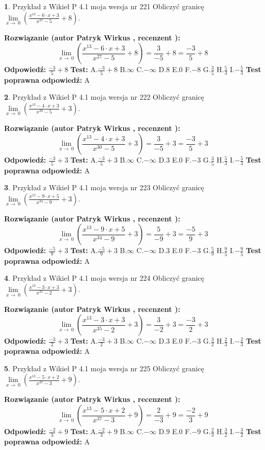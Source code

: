 \documentclass[12pt, a4paper]{article}
\theoremstyle{definition} %
\newtheorem{zad}{}
\newcommand{\zadStart}[1]{\begin{zad}#1\newline}
\newcommand{\zadStop}{\end{zad}}
\newcommand{\rozwStart}[2]{\noindent \textbf{Rozwiązanie (autor #1 , recenzent #2): }\newline}
\newcommand{\rozwStop}{\newline}
\newcommand{\odpStart}{\noindent \textbf{Odpowiedź:}\newline}
\newcommand{\odpStop}{\newline}
\newcommand{\testStart}{\noindent \textbf{Test:}\newline}
\newcommand{\testStop}{\newline}
\newcommand{\kluczStart}{\noindent \textbf{Test poprawna odpowiedź:}\newline}
\newcommand{\kluczStop}{\newline}
\begin{document}
\zadStart{Przykład z Wikieł P 4.1 moja wersja nr 221}
Obliczyć granicę $\lim\limits_{x\to\ 0}(\frac{x^{13}-6 \cdot x +3}{x^{27}-5}+8)$.
\zadStop
\rozwStart{Patryk Wirkus}{}
$$\lim\limits_{x\to\ 0}(\frac{x^{13}-6 \cdot x +3}{x^{27}-5}+8)=\frac{3}{-5}+8=\frac{-3}{5}+8$$
\rozwStop
\odpStart
$\frac{-3}{5}+8$
\odpStop
\testStart
A.$\frac{-3}{5}+8$
B.$\infty$
C.$-\infty$
D.$8$
E.$0$
F.$-8$
G.$\frac{3}{5}$
H.$\frac{5}{3}$
I.$-\frac{5}{3}$
\testStop
\kluczStart
A
\kluczStop



\zadStart{Przykład z Wikieł P 4.1 moja wersja nr 222}
Obliczyć granicę $\lim\limits_{x\to\ 0}(\frac{x^{13}-4 \cdot x +3}{x^{30}-5}+3)$.
\zadStop
\rozwStart{Patryk Wirkus}{}
$$\lim\limits_{x\to\ 0}(\frac{x^{13}-4 \cdot x +3}{x^{30}-5}+3)=\frac{3}{-5}+3=\frac{-3}{5}+3$$
\rozwStop
\odpStart
$\frac{-3}{5}+3$
\odpStop
\testStart
A.$\frac{-3}{5}+3$
B.$\infty$
C.$-\infty$
D.$3$
E.$0$
F.$-3$
G.$\frac{3}{5}$
H.$\frac{5}{3}$
I.$-\frac{5}{3}$
\testStop
\kluczStart
A
\kluczStop



\zadStart{Przykład z Wikieł P 4.1 moja wersja nr 223}
Obliczyć granicę $\lim\limits_{x\to\ 0}(\frac{x^{13}-9 \cdot x +5}{x^{34}-9}+3)$.
\zadStop
\rozwStart{Patryk Wirkus}{}
$$\lim\limits_{x\to\ 0}(\frac{x^{13}-9 \cdot x +5}{x^{34}-9}+3)=\frac{5}{-9}+3=\frac{-5}{9}+3$$
\rozwStop
\odpStart
$\frac{-5}{9}+3$
\odpStop
\testStart
A.$\frac{-5}{9}+3$
B.$\infty$
C.$-\infty$
D.$3$
E.$0$
F.$-3$
G.$\frac{5}{9}$
H.$\frac{9}{5}$
I.$-\frac{9}{5}$
\testStop
\kluczStart
A
\kluczStop



\zadStart{Przykład z Wikieł P 4.1 moja wersja nr 224}
Obliczyć granicę $\lim\limits_{x\to\ 0}(\frac{x^{13}-3 \cdot x +3}{x^{35}-2}+3)$.
\zadStop
\rozwStart{Patryk Wirkus}{}
$$\lim\limits_{x\to\ 0}(\frac{x^{13}-3 \cdot x +3}{x^{35}-2}+3)=\frac{3}{-2}+3=\frac{-3}{2}+3$$
\rozwStop
\odpStart
$\frac{-3}{2}+3$
\odpStop
\testStart
A.$\frac{-3}{2}+3$
B.$\infty$
C.$-\infty$
D.$3$
E.$0$
F.$-3$
G.$\frac{3}{2}$
H.$\frac{2}{3}$
I.$-\frac{2}{3}$
\testStop
\kluczStart
A
\kluczStop



\zadStart{Przykład z Wikieł P 4.1 moja wersja nr 225}
Obliczyć granicę $\lim\limits_{x\to\ 0}(\frac{x^{13}-5 \cdot x +2}{x^{37}-3}+9)$.
\zadStop
\rozwStart{Patryk Wirkus}{}
$$\lim\limits_{x\to\ 0}(\frac{x^{13}-5 \cdot x +2}{x^{37}-3}+9)=\frac{2}{-3}+9=\frac{-2}{3}+9$$
\rozwStop
\odpStart
$\frac{-2}{3}+9$
\odpStop
\testStart
A.$\frac{-2}{3}+9$
B.$\infty$
C.$-\infty$
D.$9$
E.$0$
F.$-9$
G.$\frac{2}{3}$
H.$\frac{3}{2}$
I.$-\frac{3}{2}$
\testStop
\kluczStart
A
\kluczStop
\end{document}
